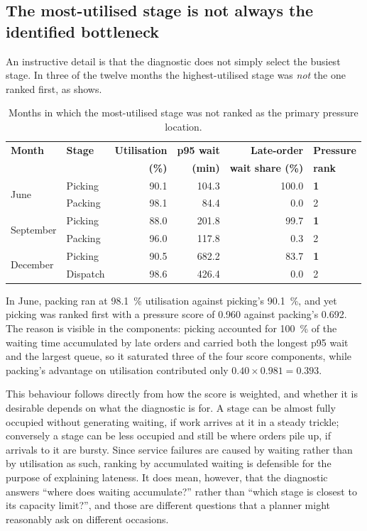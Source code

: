 \subsection{The most-utilised stage is not always the identified bottleneck}
\label{sec:res-util-vs-pressure}

An instructive detail is that the diagnostic does not simply select the busiest stage. In three
of the twelve months the highest-utilised stage was \emph{not} the one ranked first, as
 shows.

\begin{table}[htbp]
\centering
\caption[Utilisation against pressure ranking]{Months in which the most-utilised stage was not
ranked as the primary pressure location.}
\label{tab:util-vs-pressure}
\small
\begin{tabular}{llrrrl}
\toprule
\textbf{Month} & \textbf{Stage} & \textbf{Utilisation} & \textbf{p95 wait} &
\textbf{Late-order} & \textbf{Pressure} \\
 & & \textbf{(\%)} & \textbf{(min)} & \textbf{wait share (\%)} & \textbf{rank} \\
\midrule
\multirow{2}{*}{June}      & Picking & 90.1 & 104.3 & 100.0 & \textbf{1} \\
                           & Packing & 98.1 & 84.4  & 0.0   & 2 \\
\midrule
\multirow{2}{*}{September} & Picking & 88.0 & 201.8 & 99.7  & \textbf{1} \\
                           & Packing & 96.0 & 117.8 & 0.3   & 2 \\
\midrule
\multirow{2}{*}{December}  & Picking  & 90.5 & 682.2 & 83.7 & \textbf{1} \\
                           & Dispatch & 98.6 & 426.4 & 0.0  & 2 \\
\bottomrule
\end{tabular}
\end{table}

In June, packing ran at \SI{98.1}{\percent} utilisation against picking's \SI{90.1}{\percent},
and yet picking was ranked first with a pressure score of \num{0.960} against packing's
\num{0.692}. The reason is visible in the components: picking accounted for
\SI{100}{\percent} of the waiting time accumulated by late orders and carried both the longest
p95 wait and the largest queue, so it saturated three of the four score components, while
packing's advantage on utilisation contributed only \(0.40 \times 0.981 = 0.393\).

This behaviour follows directly from how the score is weighted, and whether it is desirable
depends on what the diagnostic is for. A stage can be almost fully occupied without generating
waiting, if work arrives at it in a steady trickle; conversely a stage can be less occupied and
still be where orders pile up, if arrivals to it are bursty. Since service failures are caused
by waiting rather than by utilisation as such, ranking by accumulated waiting is defensible for
the purpose of explaining lateness. It does mean, however, that the diagnostic answers ``where
does waiting accumulate?'' rather than ``which stage is closest to its capacity limit?'', and
those are different questions that a planner might reasonably ask on different occasions.


